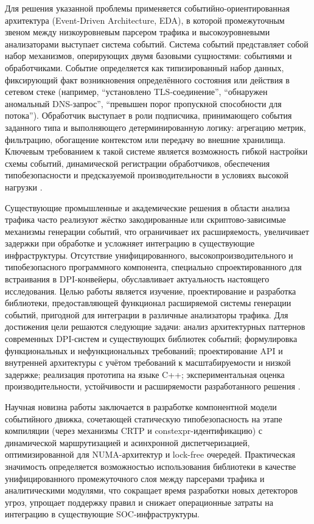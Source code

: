 Для решения указанной проблемы применяется событийно-ориентированная архитектура (Event-Driven Architecture, EDA), в которой промежуточным звеном между низкоуровневым парсером трафика и высокоуровневыми анализаторами выступает система событий.
Система событий представляет собой набор механизмов, оперирующих двумя базовыми сущностями: событиями и обработчиками.
Событие определяется как типизированный набор данных, фиксирующий факт возникновения определённого состояния или действия в сетевом стеке (например, ``установлено TLS-соединение'', ``обнаружен аномальный DNS-запрос'', ``превышен порог пропускной способности для потока'').
Обработчик выступает в роли подписчика, принимающего события заданного типа и выполняющего детерминированную логику: агрегацию метрик, фильтрацию, обогащение контекстом или передачу во внешние хранилища.
Ключевым требованием к такой системе является возможность гибкой настройки схемы событий, динамической регистрации обработчиков, обеспечения типобезопасности и предсказуемой производительности в условиях высокой нагрузки \cite{fowler2014microservices}.

Существующие промышленные и академические решения в области анализа трафика часто реализуют жёстко закодированные или скриптово-зависимые механизмы генерации событий, что ограничивает их расширяемость, увеличивает задержки при обработке и усложняет интеграцию в существующие инфраструктуры.
Отсутствие унифицированного, высокопроизводительного и типобезопасного программного компонента, специально спроектированного для встраивания в DPI-конвейеры, обуславливает актуальность настоящего исследования.
Целью работы является изучение, проектирование и разработка библиотеки, предоставляющей функционал расширяемой системы генерации событий, пригодной для интеграции в различные анализаторы трафика.
Для достижения цели решаются следующие задачи: анализ архитектурных паттернов современных DPI-систем и существующих библиотек событий;
формулировка функциональных и нефункциональных требований;
проектирование API и внутренней архитектуры с учётом требований к масштабируемости и низкой задержке;
реализация прототипа на языке C++; экспериментальная оценка производительности, устойчивости и расширяемости разработанного решения \cite{inlinac2021survey}.

Научная новизна работы заключается в разработке компонентной модели событийного движка, сочетающей статическую типобезопасность на этапе компиляции (через механизмы CRTP и constexpr-идентификацию) с динамической маршрутизацией и асинхронной диспетчеризацией, оптимизированной для NUMA-архитектур и lock-free очередей.
Практическая значимость определяется возможностью использования библиотеки в качестве унифицированного промежуточного слоя между парсерами трафика и аналитическими модулями, что сокращает время разработки новых детекторов угроз, упрощает поддержку правил и снижает операционные затраты на интеграцию в существующие SOC-инфраструктуры.

\newpage

